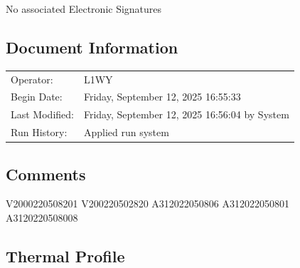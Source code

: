 \documentclass[UTF8,10pt,a4paper,fontset=fandol]{ctexart}
\newcommand{\fieldvalue}[1]{#1}
\begin{document}
\fieldvalue{No associated Electronic Signatures}

\subsection*{Document Information}

\begin{tabular}{@{}ll@{}}
Operator: &
\fieldvalue{L1WY} \\

Begin Date: &
\fieldvalue{Friday, September 12, 2025 16:55:33} \\

Last Modified: &
\fieldvalue{Friday, September 12, 2025 16:56:04 by System} \\

Run History: &
\fieldvalue{Applied run system}
\end{tabular}

\subsection*{Comments}

\fieldvalue{V2000220508201 V200220502820 A312022050806 A312022050801 A3120220508008}

\subsection*{Thermal Profile}
\end{document}

